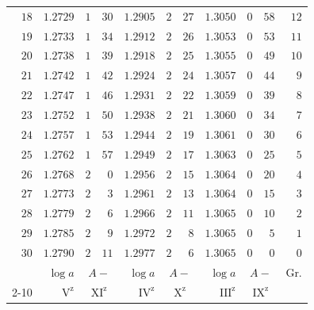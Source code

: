 \begin{center}
\begin{tabular}{r||r|rr||r|rr||r|rr||r}
$18$&$1.2729$&$1$&$30$&$1.2905$&$2$&$27$&$1.3050$&$0$&$58$&$12$\\
$19$&$1.2733$&$1$&$34$&$1.2912$&$2$&$26$&$1.3053$&$0$&$53$&$11$\\
$20$&$1.2738$&$1$&$39$&$1.2918$&$2$&$25$&$1.3055$&$0$&$49$&$10$\\[3pt]
$21$&$1.2742$&$1$&$42$&$1.2924$&$2$&$24$&$1.3057$&$0$&$44$&$9$\\
$22$&$1.2747$&$1$&$46$&$1.2931$&$2$&$22$&$1.3059$&$0$&$39$&$8$\\
$23$&$1.2752$&$1$&$50$&$1.2938$&$2$&$21$&$1.3060$&$0$&$34$&$7$\\
$24$&$1.2757$&$1$&$53$&$1.2944$&$2$&$19$&$1.3061$&$0$&$30$&$6$\\
$25$&$1.2762$&$1$&$57$&$1.2949$&$2$&$17$&$1.3063$&$0$&$25$&$5$\\[3pt]
$26$&$1.2768$&$2$&$0$&$1.2956$&$2$&$15$&$1.3064$&$0$&$20$&$4$\\
$27$&$1.2773$&$2$&$3$&$1.2961$&$2$&$13$&$1.3064$&$0$&$15$&$3$\\
$28$&$1.2779$&$2$&$6$&$1.2966$&$2$&$11$&$1.3065$&$0$&$10$&$2$\\
$29$&$1.2785$&$2$&$9$&$1.2972$&$2$&$8$&$1.3065$&$0$&$5$&$1$\\
$30$&$1.2790$&$2$&$11$&$1.2977$&$2$&$6$&$1.3065$&$0$&$0$&$0$\\
\hline
&$\log a$&\multicolumn{2}{c||}{$A-$}&$\log a$&\multicolumn{2}{c||}{$A-$}&$\log a$&\multicolumn{2}{c||}{$A-$}&Gr.\\\cline{2-10}
&$\mathrm V^{\mathrm z}$&\multicolumn{2}{c||}{$\mathrm{XI}^{\mathrm z}$}&$\mathrm{IV}^{\mathrm z}$&\multicolumn{2}{c||}{$\mathrm X^{\mathrm z}$}&$\mathrm{III}^{\mathrm z}$&\multicolumn{2}{c||}{$\mathrm{IX}^{\mathrm z}$}&
\end{tabular}
\endgroup
\end{center}
\clearpage{}
